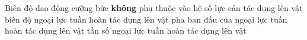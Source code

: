 \begin{ex}%
Biên độ dao động cưỡng bức \textbf{không} phụ thuộc vào
\choice
{hệ số lực cản tác dụng lên vật}
{biên độ ngoại lực tuần hoàn tác dụng lên vật}
{\True pha ban đầu của ngoại lực tuần hoàn tác dụng lên vật}
{tần số ngoại lực tuần hoàn tác dụng lên vật}
\end{ex} 


